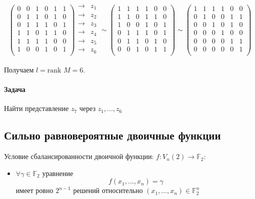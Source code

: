\documentclass[a4paper,12pt]{article}
\newcommand{\rank}{\text{rank }}
\begin{document}
	$$
	\begin{pmatrix}
		0 & 0 & 1 & 0 & 1 & 1 \\
		0 & 1 & 1 & 0 & 1 & 0 \\
		0 & 1 & 1 & 1 & 0 & 1 \\
		1 & 1 & 0 & 1 & 1 & 0 \\
		1 & 1 & 1 & 1 & 0 & 0 \\
		1 & 0 & 0 & 1 & 0 & 1 \\
	\end{pmatrix}
	\begin{matrix}
		\rightarrow & z_1 \\
		\rightarrow & z_2 \\
		\rightarrow & z_3 \\
		\rightarrow & z_4 \\
		\rightarrow & z_5 \\
		\rightarrow & z_6 \\
	\end{matrix} \sim
	\begin{pmatrix}
		1 & 1 & 1 & 1 & 0 & 0 \\
		1 & 1 & 0 & 1 & 1 & 0 \\
		1 & 0 & 0 & 1 & 0 & 1 \\
		0 & 1 & 1 & 1 & 0 & 1 \\
		0 & 1 & 1 & 0 & 1 & 0 \\
		0 & 0 & 1 & 0 & 1 & 1 \\
	\end{pmatrix} \sim
	\begin{pmatrix}
		1 & 1 & 1 & 1 & 0 & 0 \\
		0 & 1 & 0 & 0 & 1 & 1 \\
		0 & 0 & 1 & 0 & 1 & 0 \\
		0 & 0 & 0 & 1 & 0 & 0 \\
		0 & 0 & 0 & 0 & 1 & 1 \\
		0 & 0 & 0 & 0 & 0 & 1 \\
	\end{pmatrix}
	$$
	
	Получаем $l = \rank M = 6$.
	
	\paragraph{Задача} Найти представление $z_7$ через $z_1, ..., z_6$

	\subsection{Сильно равновероятные двоичные функции}
	Условие сбалансированности двоичной функции: $f: V_n(2) \rightarrow \mathbb{F}_2$:
	\begin{itemize}
	\item $\forall \gamma \in \mathbb{F}_2$ уравнение \[ f(x_1, ..., x_n) = \gamma \] имеет ровно $2^{n-1}$ решений относительно $(x_1, ..., x_n) \in \mathbb{F}_2^n$
	\end{itemize}
\end{document}
